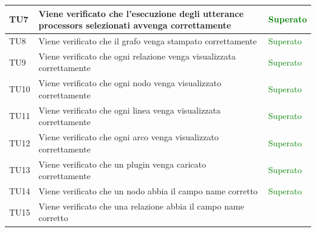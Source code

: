 \documentclass[openany,12pt,a4paper]{report}
\begin{document}
\begin{longtable}{| p{2.5cm} |p{8cm} | p{2.5cm} |}
	\hline
	\newline TU7&
	\newline Viene verificato che l'esecuzione degli utterance processors selezionati avvenga correttamente&
	\newline \textcolor{green}{Superato}
	\\[1em]
	\hline
	\newline TU8&
	\newline Viene verificato che il grafo venga stampato correttamente&
	\newline \textcolor{green}{Superato}
	\\[1em]
	\hline
	\newline TU9&
	\newline Viene verificato che ogni relazione venga visualizzata correttamente&
	\newline \textcolor{green}{Superato}
	\\[1em]
	\hline
	\newline TU10&
	\newline Viene verificato che ogni nodo venga visualizzato correttamente&
	\newline \textcolor{green}{Superato}
	\\[1em]
	\hline
	\newline TU11&
	\newline Viene verificato che ogni linea venga visualizzata correttamente&
	\newline \textcolor{green}{Superato}
	\\[1em]
	\hline
	\newline TU12&
	\newline Viene verificato che ogni arco venga visualizzato correttamente&
	\newline \textcolor{green}{Superato}
	\\[1em]
	\hline
	\newline TU13&
	\newline Viene verificato che un plugin venga caricato correttamente&
	\newline \textcolor{green}{Superato}
	\\[1em]
	\hline
	\newline TU14&
	\newline Viene verificato che un nodo abbia il campo name corretto&
	\newline \textcolor{green}{Superato}
	\\[1em]
	\hline
	\newline TU15&
	\newline Viene verificato che una relazione abbia il campo name corretto&

\end{longtable}
\end{document}
